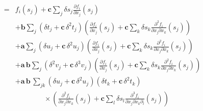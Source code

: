 \begin{align*}
\\
%
=&
f_{i} \! \left( s_{j} \right) + \mathbf{c} \sum_{j} \delta s_{j} 
\frac{ \partial f_{i} }{ \partial x_{j} } \! \left( s_{j} \right)
\\
&+ 
\mathbf{b}
\sum_{j} \left( \delta t_{j} + \mathbf{c} \, \delta^{2} t_{j} \right) 
\left( \frac{ \partial f_{i} }{ \partial x_{j} } \! \left( s_{j} \right) 
+  \mathbf{c} \sum_{k} \delta s_{k} 
\frac{ \partial^{2} f_{i} }{ \partial x_{j} \partial x_{k} } \! \left( s_{j} \right) \right)
\\
&+ 
\mathbf{a} \sum_{j}
\left( \delta u_{j} + \mathbf{c} \, \delta^{2} u_{j} \right) 
\left( \frac{ \partial f_{i} }{ \partial x_{j} } \! \left( s_{j} \right) 
+ \mathbf{c} \sum_{k} \delta s_{k} 
\frac{ \partial^{2} f_{i} }{ \partial x_{j} \partial x_{k} } \! \left( s_{j} \right) \right)
\\
& + \mathbf{a} \, \mathbf{b} \sum_{j}
\left( \delta^{2} v_{j} + \mathbf{c} \, \delta^{3} v_{j} \right) 
\left( \frac{ \partial f_{i} }{ \partial x_{j} } \! \left( s_{j} \right) 
+ \mathbf{c} \sum_{k} \delta s_{k} 
\frac{ \partial^{2} f_{i} }{ \partial x_{j} \partial x_{k} } \! \left( s_{j} \right) \right)
\\
&+ 
\mathbf{a} \, \mathbf{b} \, \sum_{jk} 
\left( \delta u_{j} + \mathbf{c} \, \delta^{2} u_{j} \right) 
\left( \delta t_{k} + \mathbf{c} \, \delta^{2} t_{k} \right)
\\
& \quad\quad\quad\quad \times \left(
\frac{ \partial^{2} f_{i} }{ \partial x_{j} \partial x_{k} } \! \left( s_{j} \right) 
+ \mathbf{c} \sum_{l} \delta s_{l} 
\frac{ \partial^{3} f_{i} }{ \partial x_{j} \partial x_{k} \partial_{l} } \! \left( s_{j} \right)
\right)
\\
%
\end{align*}

